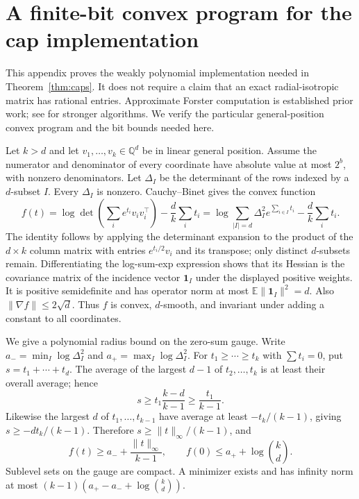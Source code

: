\documentclass[11pt]{article}
\newcommand{\E}{\mathbb E}
\newcommand{\1}{\mathbf 1}
\begin{document}


\section{A finite-bit convex program for the cap implementation}\label{app:convex}
This appendix proves the weakly polynomial implementation needed in Theorem~\ref{thm:caps}. It does not require a claim that an exact radial-isotropic matrix has rational entries. Approximate Forster computation is established prior work; see \citet{DKT22} for stronger algorithms. We verify the particular general-position convex program and the bit bounds needed here.

Let $k>d$ and let $v_1,\ldots,v_k\in\mathbb Q^d$ be in linear general position. Assume the numerator and denominator of every coordinate have absolute value at most $2^b$, with nonzero denominators. Let $\Delta_I$ be the determinant of the rows indexed by a $d$-subset $I$. Every $\Delta_I$ is nonzero. Cauchy--Binet gives the convex function
\begin{equation}\label{eq:barthe}
 f(t)=\log\det\left(\sum_i e^{t_i}v_iv_i^\top\right)-\frac dk\sum_i t_i
 =\log\sum_{|I|=d}\Delta_I^2e^{\sum_{i\in I}t_i}-\frac dk\sum_i t_i.
\end{equation}
The identity follows by applying the determinant expansion to the product of the $d\times k$ column matrix with entries $e^{t_i/2}v_i$ and its transpose; only distinct $d$-subsets remain. Differentiating the log-sum-exp expression shows that its Hessian is the covariance matrix of the incidence vector $\1_I$ under the displayed positive weights. It is positive semidefinite and has operator norm at most $\E\|\1_I\|^2=d$. Also $\|\nabla f\|\le2\sqrt d$. Thus $f$ is convex, $d$-smooth, and invariant under adding a constant to all coordinates.

We give a polynomial radius bound on the zero-sum gauge. Write $a_- =\min_I\log\Delta_I^2$ and $a_+=\max_I\log\Delta_I^2$. For $t_1\ge\cdots\ge t_k$ with $\sum t_i=0$, put $s=t_1+\cdots+t_d$. The average of the largest $d-1$ of $t_2,\ldots,t_k$ is at least their overall average; hence
\[
 s\ge t_1\frac{k-d}{k-1}\ge\frac{t_1}{k-1}.
\]
Likewise the largest $d$ of $t_1,\ldots,t_{k-1}$ have average at least $-t_k/(k-1)$, giving $s\ge -dt_k/(k-1)$. Therefore $s\ge\|t\|_\infty/(k-1)$, and
\[
 f(t)\ge a_-+\frac{\|t\|_\infty}{k-1},\qquad
 f(0)\le a_++\log\binom kd.
\]
Sublevel sets on the gauge are compact. A minimizer exists and has infinity norm at most $(k-1)(a_+-a_-+\log\binom kd)$.
\end{document}
